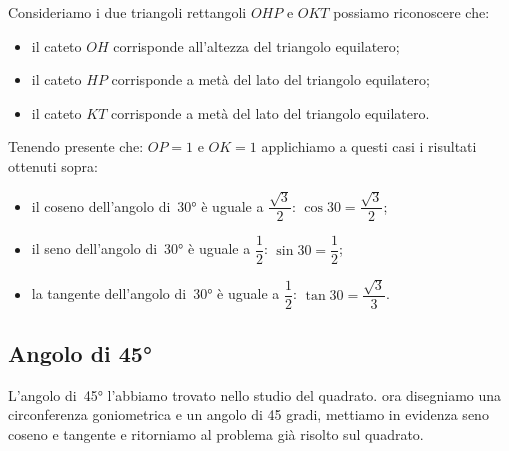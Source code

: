  \begin{minipage}{.45\textwidth}
  \begin{center}
\begin{inaccessibleblock}
\angolotrenta
%     
\end{inaccessibleblock}
  \end{center}
 \end{minipage}
 \begin{minipage}{.45\textwidth}
Consideriamo i due triangoli rettangoli \(OHP\) e \(OKT\) possiamo riconoscere 
che:
\begin{itemize} [noitemsep]
 \item il cateto \(OH\) corrisponde all'altezza del triangolo equilatero; 
 \item il cateto \(HP\) corrisponde a metà del lato del triangolo equilatero;
 \item il cateto \(KT\) corrisponde a metà del lato del triangolo equilatero.\\
\end{itemize}
 \end{minipage}

Tenendo presente che: \(OP=1\) e \(OK=1\) applichiamo a questi casi i risultati 
ottenuti sopra:
\begin{itemize} [noitemsep]
 \item il coseno dell'angolo di~30° è uguale a \(\dfrac{\sqrt{3}}{2}\): 
  \(\cos 30 = \dfrac{\sqrt{3}}{2}\); 
 \item il seno dell'angolo di~30° è uguale a \(\dfrac{1}{2}\): 
  \(\sin 30 = \dfrac{1}{2}\); 
 \item la tangente dell'angolo di~30° è uguale a \(\dfrac{1}{2}\): 
  \(\tan 30 = \dfrac{\sqrt{3}}{3}\).
\end{itemize}

\subsection{Angolo di 45°}

L'angolo di~45° l'abbiamo trovato nello studio del quadrato. ora 
disegniamo una circonferenza goniometrica e un angolo di 45 gradi, mettiamo 
in evidenza seno coseno e tangente e ritorniamo al problema già risolto sul 
quadrato.\\

